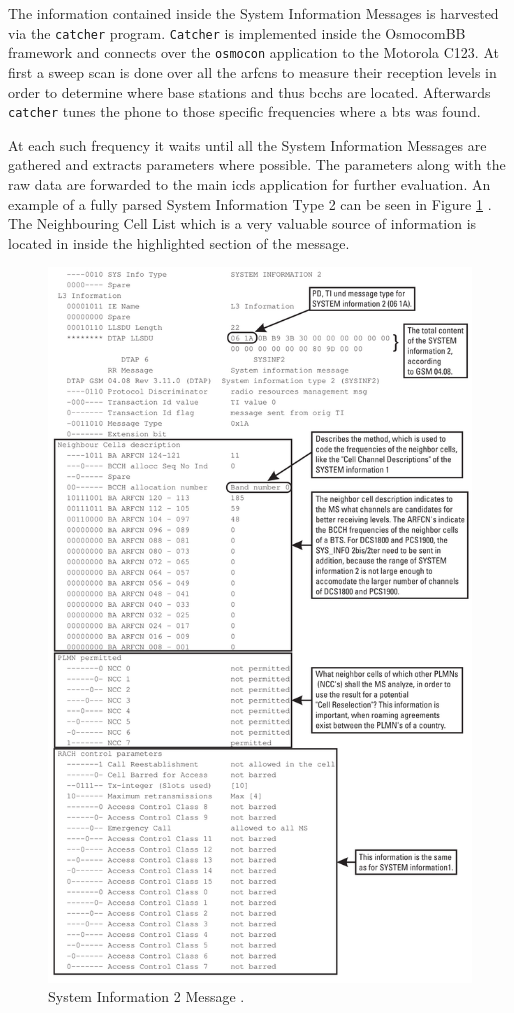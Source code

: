 The information contained inside the System Information Messages is harvested via the \texttt{catcher} program.
\texttt{Catcher} is implemented inside the OsmocomBB framework and connects over the \texttt{osmocon} application to the Motorola C123.
At first a sweep scan is done over all the \glspl{arfcn} to measure their reception levels in order to determine where base stations and thus \glspl{bcch} are located.
Afterwards \texttt{catcher} tunes the phone to those specific frequencies where a \gls{bts} was found.

At each such frequency it waits until all the System Information Messages are gathered and extracts parameters where possible.
The parameters along with the raw data are forwarded to the main \gls{icds} application for further evaluation.
An example of a fully parsed System Information Type 2 can be seen in Figure \ref{fig:si1} \cite{protocols1999}.
The Neighbouring Cell List which is a very valuable source of information is located in inside the highlighted section of the message.
\begin{figure}
\centering
\includegraphics[width=.9\textwidth]{../Images/sysinfo2}
\caption{System Information 2 Message \cite{protocols1999}.}
\label{fig:si1}
\end{figure}
